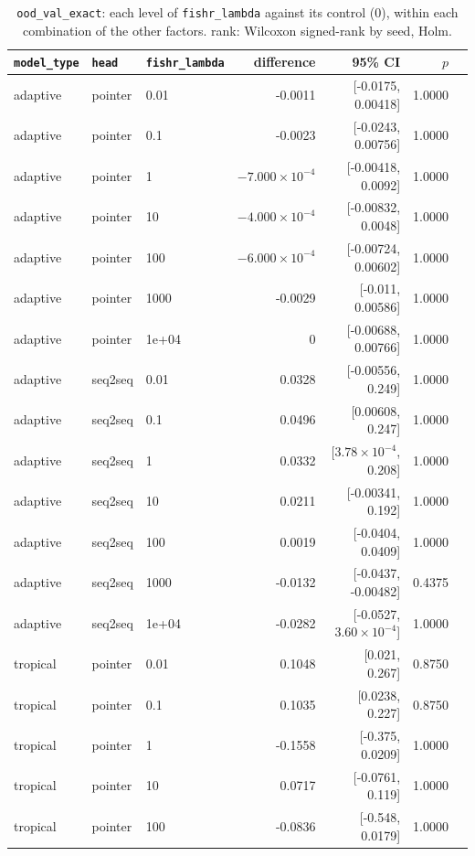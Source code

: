 \documentclass[10pt]{article}
\begin{document}
{\small
\begin{longtable}{lllrrrl}
\caption{\texttt{ood\_val\_exact}: each level of \texttt{fishr\_lambda} against its control (0), within each combination of the other factors. rank: Wilcoxon signed-rank by seed, Holm.}\label{tab:control-ood_val_exact}\\
\toprule
\texttt{model\_type} & \texttt{head} & \texttt{fishr\_lambda} & difference & 95\% CI & $p$ & \\
\midrule
\endhead
adaptive & pointer & 0.01 & -0.0011 & [-0.0175, 0.00418] & 1.0000 & \\
adaptive & pointer & 0.1 & -0.0023 & [-0.0243, 0.00756] & 1.0000 & \\
adaptive & pointer & 1 & $-7.000\times10^{-4}$ & [-0.00418, 0.0092] & 1.0000 & \\
adaptive & pointer & 10 & $-4.000\times10^{-4}$ & [-0.00832, 0.0048] & 1.0000 & \\
adaptive & pointer & 100 & $-6.000\times10^{-4}$ & [-0.00724, 0.00602] & 1.0000 & \\
adaptive & pointer & 1000 & -0.0029 & [-0.011, 0.00586] & 1.0000 & \\
adaptive & pointer & 1e+04 & 0 & [-0.00688, 0.00766] & 1.0000 & \\
adaptive & seq2seq & 0.01 & 0.0328 & [-0.00556, 0.249] & 1.0000 & \\
adaptive & seq2seq & 0.1 & 0.0496 & [0.00608, 0.247] & 1.0000 & \\
adaptive & seq2seq & 1 & 0.0332 & [$3.78\times10^{-4}$, 0.208] & 1.0000 & \\
adaptive & seq2seq & 10 & 0.0211 & [-0.00341, 0.192] & 1.0000 & \\
adaptive & seq2seq & 100 & 0.0019 & [-0.0404, 0.0409] & 1.0000 & \\
adaptive & seq2seq & 1000 & -0.0132 & [-0.0437, -0.00482] & 0.4375 & \\
adaptive & seq2seq & 1e+04 & -0.0282 & [-0.0527, $3.60\times10^{-4}$] & 1.0000 & \\
tropical & pointer & 0.01 & 0.1048 & [0.021, 0.267] & 0.8750 & \\
tropical & pointer & 0.1 & 0.1035 & [0.0238, 0.227] & 0.8750 & \\
tropical & pointer & 1 & -0.1558 & [-0.375, 0.0209] & 1.0000 & \\
tropical & pointer & 10 & 0.0717 & [-0.0761, 0.119] & 1.0000 & \\
tropical & pointer & 100 & -0.0836 & [-0.548, 0.0179] & 1.0000 & \\

\end{longtable}}
\end{document}
